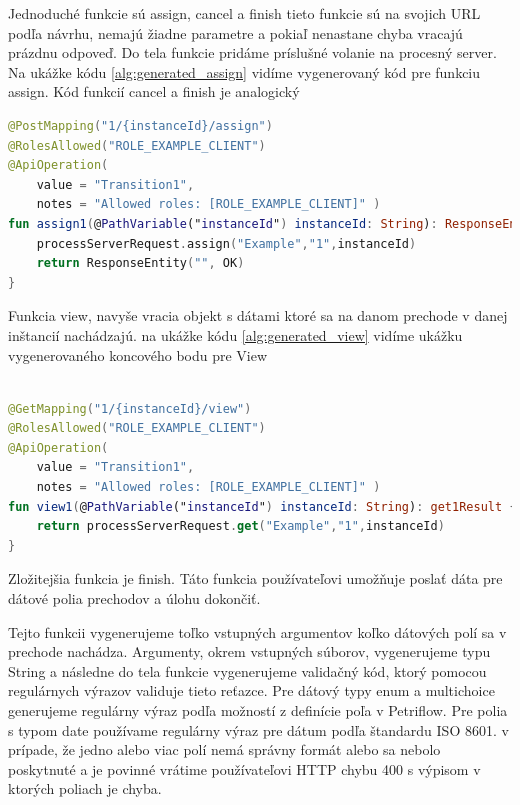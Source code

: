 Jednoduché funkcie sú assign, cancel a finish tieto funkcie sú na svojich URL podľa návrhu, nemajú žiadne parametre a pokiaľ nenastane chyba vracajú prázdnu odpoveď. Do tela funkcie pridáme príslušné volanie na procesný server. Na ukážke kódu \ref{alg:generated_assign} vidíme vygenerovaný kód pre funkciu assign. Kód funkcií cancel a finish je analogický

\begin{lstlisting}[float, caption={Príklad vygenerovanej funkcie},label={alg:generated_assign},language=Kotlin]
@PostMapping("1/{instanceId}/assign")
@RolesAllowed("ROLE_EXAMPLE_CLIENT")
@ApiOperation(
	value = "Transition1",
	notes = "Allowed roles: [ROLE_EXAMPLE_CLIENT]" )
fun assign1(@PathVariable("instanceId") instanceId: String): ResponseEntity<String> {
	processServerRequest.assign("Example","1",instanceId)
	return ResponseEntity("", OK)
}
\end{lstlisting}

Funkcia view, navyše vracia objekt s dátami ktoré sa na danom prechode v danej inštancií nachádzajú. na ukážke kódu \ref{alg:generated_view} vidíme ukážku vygenerovaného koncového bodu pre View

\begin{lstlisting}[float, caption={Príklad vygenerovanej funkcie},label={alg:generated_view},language=Kotlin]

@GetMapping("1/{instanceId}/view")
@RolesAllowed("ROLE_EXAMPLE_CLIENT")
@ApiOperation(
	value = "Transition1",
	notes = "Allowed roles: [ROLE_EXAMPLE_CLIENT]" )
fun view1(@PathVariable("instanceId") instanceId: String): get1Result {
	return processServerRequest.get("Example","1",instanceId)
}
\end{lstlisting}


Zložitejšia funkcia je finish. Táto funkcia používateľovi umožňuje poslať dáta pre dátové polia prechodov a úlohu dokončiť.

Tejto funkcii vygenerujeme toľko vstupných argumentov koľko dátových polí sa v prechode nachádza. Argumenty, okrem vstupných súborov, vygenerujeme typu String a následne do tela funkcie vygenerujeme validačný kód, ktorý pomocou regulárnych výrazov validuje tieto reťazce. Pre dátový typy enum a multichoice generujeme regulárny výraz podľa možností z definície poľa v Petriflow. Pre polia s typom date používame regulárny výraz pre dátum podľa štandardu ISO 8601. v prípade, že jedno alebo viac polí nemá správny formát alebo sa nebolo poskytnuté a je povinné vrátime používateľovi HTTP chybu 400 s výpisom v ktorých poliach je chyba.

